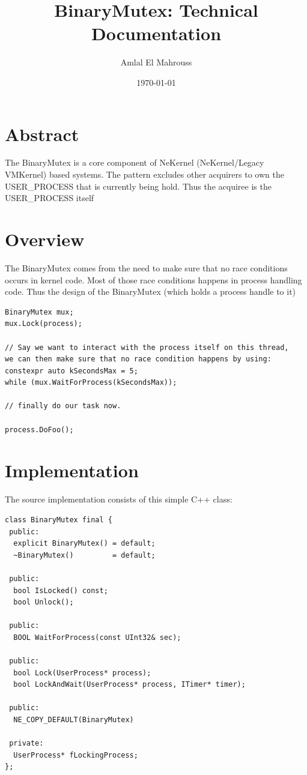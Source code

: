 \documentclass{article}
\title{BinaryMutex: Technical Documentation}
\author{Amlal El Mahrouss}
\date{\today}
\begin{document}
\maketitle

\section{Abstract}

{The BinaryMutex is a core component of NeKernel (NeKernel/Legacy VMKernel) based systems. The pattern excludes other acquirers to own the USER\_PROCESS that is currently being hold. Thus the acquiree is the USER\_PROCESS itself}

\section{Overview}

{The BinaryMutex comes from the need to make sure that no race conditions occurs in kernel code. Most of those race conditions happens in process handling code. Thus the design of the BinaryMutex (which holds a process handle to it)}

\begin{verbatim}
BinaryMutex mux;
mux.Lock(process);

// Say we want to interact with the process itself on this thread, 
we can then make sure that no race condition happens by using:
constexpr auto kSecondsMax = 5;
while (mux.WaitForProcess(kSecondsMax));

// finally do our task now.

process.DoFoo();
\end{verbatim}

\section{Implementation}

The source implementation consists of this simple C++ class:

\begin{verbatim}
class BinaryMutex final {
 public:
  explicit BinaryMutex() = default;
  ~BinaryMutex()         = default;

 public:
  bool IsLocked() const;
  bool Unlock();

 public:
  BOOL WaitForProcess(const UInt32& sec);

 public:
  bool Lock(UserProcess* process);
  bool LockAndWait(UserProcess* process, ITimer* timer);

 public:
  NE_COPY_DEFAULT(BinaryMutex)

 private:
  UserProcess* fLockingProcess;
};
\end{verbatim}
\end{document}
